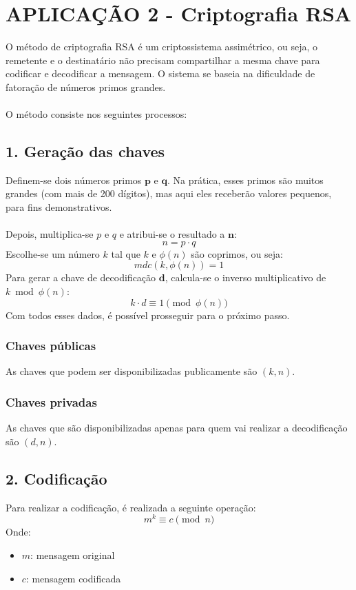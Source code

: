 \section*{APLICAÇÃO 2 - Criptografia RSA}
O método de criptografia RSA é um criptossistema assimétrico, ou seja, o remetente e o destinatário não precisam compartilhar a mesma chave para codificar e decodificar a mensagem. O sistema se baseia na dificuldade de fatoração de números primos grandes.\\\\
O método consiste nos seguintes processos:

\subsection*{1. Geração das chaves}
Definem-se dois números primos $\mathbf{p}$ e $\mathbf{q}$. Na prática, esses primos são muitos grandes (com mais de 200 dígitos), mas aqui eles receberão valores pequenos, para fins demonstrativos.\\\\
Depois, multiplica-se $p$ e $q$ e atribui-se o resultado a $\mathbf{n}$:
\[
    n = p \cdot q
\]
Escolhe-se um número $k$ tal que $k$ e $\phi(n)$ são coprimos, ou seja:
\[
    mdc(k, \phi(n)) = 1
\]
Para gerar a chave de decodificação $\mathbf{d}$, calcula-se o inverso multiplicativo de $k \bmod \phi(n)$:
\[
    k \cdot d \equiv 1 \pmod{\phi(n)}
\]
Com todos esses dados, é possível prosseguir para o próximo passo.

\vspace{24pt}
\subsubsection*{Chaves públicas}
As chaves que podem ser disponibilizadas publicamente são $(k,n)$.

\subsubsection*{Chaves privadas}
As chaves que são disponibilizadas apenas para quem vai realizar a decodificação são $(d,n)$.

\subsection*{2. Codificação}
Para realizar a codificação, é realizada a seguinte operação:
\[
    m^{k} \equiv c \pmod {n}
\]
Onde:
\begin{itemize}
    \item $m$: mensagem original
    \item $c$: mensagem codificada
\end{itemize}


